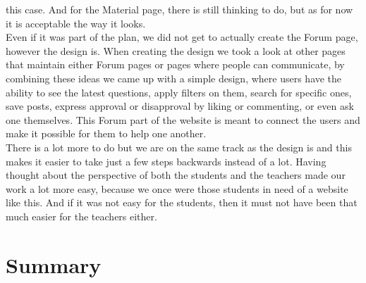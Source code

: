 \documentclass[12pt,a4paper]{article}
\begin{document}
\begin{spacing}{1.5}
    this case. And for the Material page, there is still thinking to do, but as for
    now it is acceptable the way it looks. \\ \indent Even if it was part of the
    plan, we did not get to actually create the Forum page, however the design is.
    When creating the design we took a look at other pages that maintain either
    Forum pages or pages where people can communicate, by combining these ideas we
    came up with a simple design, where users have the ability to see the latest
    questions, apply filters on them, search for specific ones, save posts, express
    approval or disapproval by liking or commenting, or even ask one themselves.
    This Forum part of the website is meant to connect the users and make it
    possible for them to help one another. \\ \indent There is a lot more to do but
    we are on the same track as the design is and this makes it easier to take just
    a few steps backwards instead of a lot. Having thought about the perspective of
    both the students and the teachers made our work a lot more easy, because we
    once were those students in need of a website like this. And if it was not easy
    for the students, then it must not have been that much easier for the teachers
    either.

    \section{Summary}

\end{spacing}
\end{document}
